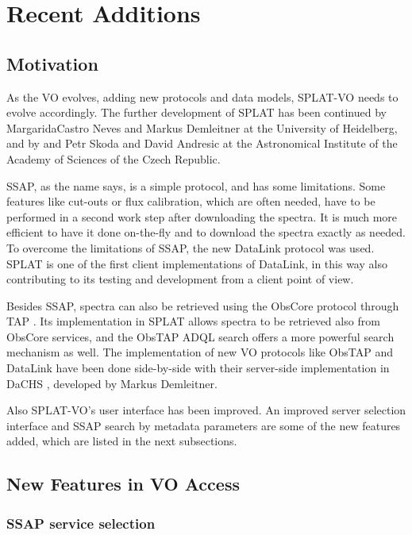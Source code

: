 \documentclass[final,authoryear,5p,times,twocolumn]{elsarticle}
\begin{document}
\section{Recent Additions}


\subsection{Motivation}

As the VO evolves, adding new protocols and data models, SPLAT-VO
needs to evolve accordingly.  The further development of SPLAT has
been continued by MargaridaCastro Neves and Markus Demleitner at the
University of Heidelberg, and by and Petr Skoda and David Andresic at
the Astronomical Institute of the Academy of Sciences of the Czech
Republic.

SSAP, as the name says, is a simple protocol, and has some
limitations. Some features like cut-outs or flux calibration, which
are often needed, have to be performed in a second work step after
downloading the spectra. It is much more efficient to have it done
on-the-fly and  to download the spectra exactly as needed. To overcome
the limitations of SSAP, the new DataLink protocol \citep{datalink}
was used. SPLAT is one of the first client implementations of
DataLink, in this way also contributing to its testing and development
from a client point of view.

Besides SSAP, spectra can also be retrieved using the ObsCore protocol
through TAP \citep[known as ObsTap;][]{obstap}. Its implementation in
SPLAT allows spectra to be retrieved also from ObsCore services, and
the ObsTAP ADQL \citep{adql} search offers a more powerful search
mechanism as well. The implementation of new VO protocols like ObsTAP
and DataLink have been done side-by-side with their server-side
implementation in DaCHS \citep[Data Center Helper Suite;][]{dachs},
developed by Markus Demleitner.

Also SPLAT-VO's user interface has been improved. An improved server
selection interface and SSAP search by metadata parameters are some of
the new features added, which are listed in the next subsections.

\subsection{New Features in VO Access}

\subsubsection{SSAP service selection}
\end{document}
